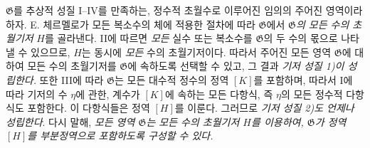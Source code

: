 
$\mathfrak G$를 추상적 성질 I--IV를 만족하는, 정수적 초월수로 이루어진 임의의 주어진 영역이라 하자. E. 체르멜로가 모든 복소수의 체에 적용한 절차에 따라 $\mathfrak G$에서 \emph{$\mathfrak G$의 모든 수의 초월기저} $H$를 골라낸다. II에 따르면 \emph{모든} 실수 또는 복소수를 $\mathfrak G$의 두 수의 몫으로 나타낼 수 있으므로, $H$는 동시에 \emph{모든} 수의 초월기저이다. 따라서 주어진 모든 영역 $\mathfrak G$에 대하여 모든 수의 초월기저를 $\mathfrak G$에 속하도록 선택할 수 있고, 그 결과 \emph{기저 성질 1)이 성립한다.} 또한 III에 따라 $\mathfrak G$는 모든 대수적 정수의 정역 $[K]$를 포함하며, 따라서 I에 따라 기저의 수 $\eta$에 관한, 계수가 $[K]$에 속하는 모든 다항식, 즉 $\eta$의 모든 정수적 다항식도 포함한다. 이 다항식들은 정역 $[H]$를 이룬다. 그러므로 \emph{기저 성질 2)도 언제나 성립한다}. 다시 말해, \emph{모든 영역 $\mathfrak G$는 모든 수의 초월기저 $H$를 이용하여, $\mathfrak G$가 정역 $[H]$를 부분정역으로 포함하도록 구성할 수 있다.}
